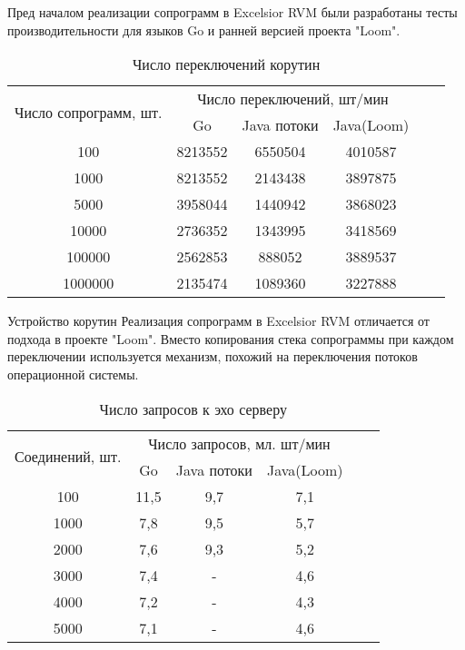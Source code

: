 	Пред началом реализации сопрограмм в Excelsior RVM были разработаны тесты производительности для языков Go и ранней
	версией проекта "Loom".
	
	\begin{table}[H]
		\caption{Число переключений корутин}\label{inc-matrix}
		\begin{tabular}{|c|c|c|c|c|c|}
			\hline \multirow{2}{*}{Число сопрограмм, шт.} & \multicolumn{3}{|c|}{Число переключений, шт/мин}    \\
			\cline{2-4}    & Go      & Java потоки & Java(Loom) \\
			\hline 100     & 8213552 & 6550504     & 4010587    \\
			\hline 1000    & 8213552 & 2143438     & 3897875    \\
			\hline 5000    & 3958044 & 1440942     & 3868023    \\
			\hline 10000   & 2736352 & 1343995     & 3418569    \\
			\hline 100000  & 2562853 & 888052      & 3889537    \\
			\hline 1000000 & 2135474 & 1089360     & 3227888    \\
			\hline 
		\end{tabular}
	\end{table}
	
	Устройство корутин 
	Реализация сопрограмм в Excelsior RVM отличается от подхода в проекте "Loom". Вместо копирования 
	стека сопрограммы при каждом переключении используется механизм, похожий на переключения потоков 
	операционной системы.
	
		\begin{table}[H]
		\caption{Число запросов к эхо серверу}\label{inc-matrix}
		\begin{tabular}{|c|c|c|c|c|c|}
			\hline \multirow{2}{*}{Соединений, шт.} & 
			\multicolumn{3}{|c|}{Число запросов, мл. шт/мин} \\
			\cline{2-4} & Go   & Java потоки  & Java(Loom)   \\
			\hline 100  & 11,5 & 9,7          & 7,1          \\
			\hline 1000 & 7,8  & 9,5          & 5,7          \\
			\hline 2000 & 7,6  & 9,3          & 5,2          \\
			\hline 3000 & 7,4  & -            & 4,6          \\
			\hline 4000 & 7,2  & -            & 4,3          \\
			\hline 5000 & 7,1  & -            & 4,6          \\
			\hline 
		\end{tabular}
	\end{table}
	
	
\clearpage
